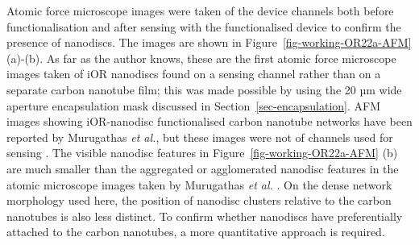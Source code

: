 \documentclass[
  a4paper,
]{scrbook}
\begin{document}
Atomic force microscope images were taken of the device channels both
before functionalisation and after sensing with the functionalised
device to confirm the presence of nanodiscs. The images are shown in
Figure~\ref{fig-working-OR22a-AFM} (a)-(b). As far as the author knows,
these are the first atomic force microscope images taken of iOR
nanodiscs found on a sensing channel rather than on a separate carbon
nanotube film; this was made possible by using the 20 µm wide aperture
encapsulation mask discussed in Section~\ref{sec-encapsulation}. AFM
images showing iOR-nanodisc functionalised carbon nanotube networks have
been reported by Murugathas \emph{et al.}, but these images were not of
channels used for sensing \autocite{Murugathas2019a}. The visible
nanodisc features in Figure~\ref{fig-working-OR22a-AFM} (b) are much
smaller than the aggregated or agglomerated nanodisc features in the
atomic microscope images taken by Murugathas \emph{et al.}
\autocite{Murugathas2019a}. On the dense network morphology used here,
the position of nanodisc clusters relative to the carbon nanotubes is
also less distinct. To confirm whether nanodiscs have preferentially
attached to the carbon nanotubes, a more quantitative approach is
required.
\end{document}
